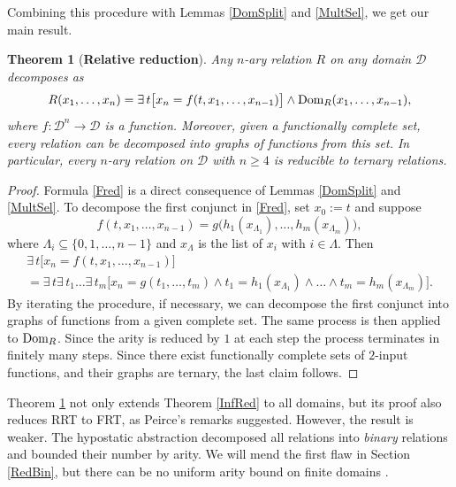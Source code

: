 \documentclass[11pt]{article}
\theoremstyle{plain}
\newtheorem{theorem}{Theorem}
\theoremstyle{definition}
\def\D{\mathcal{D}}
\def\L{\Lambda}
\begin{document}
Combining this procedure with Lemmas \ref{DomSplit} and \ref{MultSel}, we get our main result.
\begin{theorem}[{\bf Relative reduction}]\label{FunRed} Any $n$-ary relation $R$ on any domain $\D$ decomposes as
\begin{equation}\label{Fred}
R(x_1,\dots,x_n)=\exists\,t\big[x_n=f(t,x_1,\dots,x_{n-1})\big]\land\textup{Dom}_R(x_1,\dots,x_{n-1}),
\end{equation}
where $f:\D^{n}\to\D$ is a function. Moreover, given a functionally complete set, every relation can be decomposed into graphs of functions from this set. In particular, every $n$-ary relation on $\D$ with $n\geq4$ is reducible to ternary relations.  
\end{theorem}
\begin{proof} Formula \eqref{Fred} is a direct consequence of Lemmas \ref{DomSplit} and \ref{MultSel}. To decompose the first conjunct in \eqref{Fred}, set $x_0:=t$ and suppose
$$
f(t,x_1,\dots,x_{n-1})=g\big(h_1(x_{\L_1}),\dots,
h_m(x_{\L_m})\big),
$$
where $\L_i\subseteq\{0,1,\dots,n-1\}$ and $x_{\L}$ is the list of $x_i$ with $i\in\L$. Then
\begin{multline}\label{Fun2Rel}
\exists\,t\big[x_n=f(t,x_1,\dots,x_{n-1})\big]\\ 
= \exists\,t\exists\,t_1\dots\exists\,t_m
\big[x_n=g(t_1,\dots,t_m)\land t_1=h_1(x_{\L_1})\land\dots\land t_m=h_m(x_{\L_m})\big].
\end{multline}
By iterating the procedure, if necessary, we can decompose the first conjunct into graphs of functions from a given complete set. The same process is then applied to $\textup{Dom}_R$. Since the arity is reduced by $1$ at each step the process terminates in finitely many steps. Since there exist functionally complete sets of $2$-input functions, and their graphs are ternary, the last claim follows.
\end{proof}
\noindent Theorem \ref{FunRed} not only extends Theorem \ref{InfRed} to all domains, but its proof also reduces RRT to FRT, as Peirce's remarks suggested. However, the result is weaker. The hypostatic abstraction decomposed all relations into {\it binary} relations and bounded their number by arity. We will mend the first flaw in Section \ref{RedBin}, but there can be no uniform arity bound on finite domains \cite{Kosh23}. 
\end{document}
